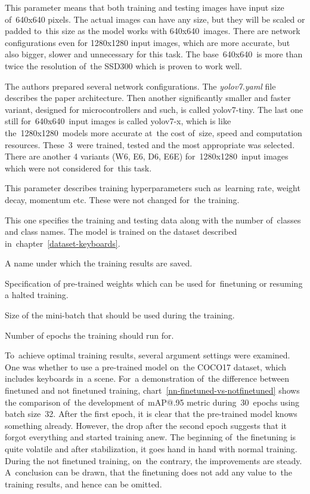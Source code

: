 \begin{description}[topsep=0pt,itemsep=-1.5pt,partopsep=6pt]
  \item[-{}-img-size] This parameter means that both training and testing images have input size of~640x640 pixels. The actual images can have any size, but they will be scaled or padded to~this size as the model works with 640x640~images. There are network configurations even for 1280x1280 input images, which are more accurate, but also bigger, slower and unnecessary for this task. The base~640x640~is more than twice the resolution of~the SSD300 which is proven to work well.
  \item[-{}-cfg] The authors prepared several network configurations. The \emph{yolov7.yaml} file describes the paper architecture. Then another significantly smaller and faster variant, designed for microcontrollers and such, is called yolov7-tiny. The last one still for~640x640~input images is called yolov7-x, which is like the~1280x1280~models more accurate at~the cost of~size, speed and computation resources. These~3~were trained, tested and the most appropriate was selected. There are another 4 variants (W6, E6, D6, E6E) for~1280x1280~input images which were not considered for~this task.
  \item[-{}-hyp] This parameter describes training hyperparameters such as~learning rate, weight decay, momentum etc. These were not changed for~the training.
  \item[-{}-data] This one specifies the training and testing data along with the number of~classes and class names. The model is trained on the dataset described in~chapter~\ref{dataset-keyboards}.
  \item[-{}-name] A name under which the training results are saved.
  \item[-{}-weights] Specification of pre-trained weights which can be used for~finetuning or resuming a halted training.
  \item[-{}-batch-size] Size of the mini-batch that should be used during the training.
  \item[-{}-epochs] Number of epochs the training should run for.
\end{description}

To~achieve optimal training results, several argument settings were examined. One was whether to use a pre-trained model on~the COCO17 dataset, which includes keyboards in~a scene. For~a demonstration of~the difference between finetuned and not finetuned training, chart~\ref{nn-finetuned-vs-notfinetuned} shows the comparison of~the development of~mAP@.95 metric during~30~epochs using batch size~32. After the first epoch, it is clear that the pre-trained model knows something already. However, the drop after the second epoch suggests that it forgot \hbox{everything} and started training anew. The beginning of~the finetuning is quite volatile and after stabilization, it goes hand in hand with normal training. During the not finetuned training, on~the contrary, the improvements are steady. A~conclusion can be drawn, that the finetuning does not add any value to~the training results, and hence can be omitted.

